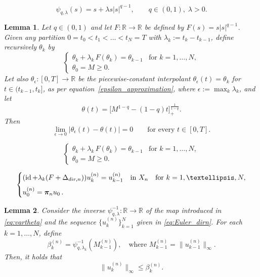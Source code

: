 \documentclass[10pt,a4paper]{amsart}
\newtheorem{lemma}{Lemma}
\newcommand{\R}{\mathbb{R}}
\begin{document}
\begin{equation}\label{eq:vartheta}
    \psi_{q,\lambda} (s) = s + \lambda s|s|^{q-1}, \qquad  q\in (0,1), \; \lambda >0.
\end{equation}

\begin{lemma}\label{lem:supersolution}
    Let $q\in(0,1)$ and let $F: \R \to\R$ be defined  by $F(s)= s |s|^{q-1}$.
Given  any partition $0=t_0<t_1<\ldots<t_N= T$ with $\lambda_k:=t_k-t_{k-1}$, define recursively $\theta_k$ by 
\begin{equation}\label{eq:lem:supersolution}
\begin{cases}
\theta_k+\lambda_k\,F(\theta_k)=\theta_{k-1} &\mbox{for } k=1,\ldots, N,\\
 \theta_0=M\geq 0.
\end{cases}
\end{equation}
Let  also $\theta_\epsilon:[0,T]\to\R$ be the piecewise-constant interpolant  $\theta_\epsilon(t)=\theta_k$ for $t\in(t_{k-1},t_k]$, as per equation~\eqref{epsilon_approximation}, where $\epsilon:=\max_k\lambda_k$, and let
\[
\theta(t)=\bigl[M^{1-q}-(1-q)t\bigr]_+^{\frac1{1-q}}.
\]
Then 
$$
\lim_{\epsilon \to 0}|\theta_\epsilon(t) - \theta (t)|=0 \qquad \mbox{for every } t\in [0, T].
$$
\end{lemma}

\begin{equation}
\begin{cases}
\theta_k+\lambda_k\,F(\theta_k)=\theta_{k-1} &\mbox{for } k=1,\ldots, N,\\
 \theta_0=M\geq 0.
\end{cases}
\end{equation}

\begin{equation}\label{eq:Euler_dirn}
\begin{cases}
   (\operatorname{id} + \lambda_k (F + \Delta_{\textnormal{dir}, n}))u_k^{(n)}  = u_{k-1}^{(n)} \quad \text{in }X_n & \text{for } k = 1,\dots,N,\\[6pt]
   u^{(n)}_0 = \boldsymbol{\pi}_n u_0\,.
\end{cases}
\end{equation}

\begin{lemma}\label{lem:upper_bound_k}
Consider the inverse $\psi_{q,\lambda}^{-1}: \R \to\R$ of the map introduced in \eqref{eq:vartheta} and the sequence $\{u_k^{(n)}\}_{k=1}^N$ given in \eqref{eq:Euler_dirn}. For each $k = 1,\dots,N$, define
\begin{equation}
\beta_k^{(n)} = \psi_{q,\lambda_k}^{-1}(M_{k-1}^{(n)}), \quad \text{where } M_{k-1}^{(n)} = \|u_{k-1}^{(n)}\|_\infty.
\end{equation}
Then, it holds that
\[
\|u_{k}^{(n)}\|_\infty \leq \beta_k^{(n)}.
\]
\end{lemma}
\end{document}
